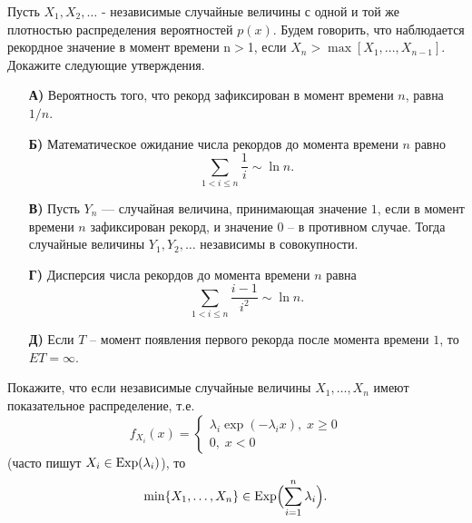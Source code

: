 \begin{problem}[рекорды]
Пусть $X_1 ,X_2 ,\ldots $ - независимые 
случайные величины с одной и той же плотностью распределения вероятностей 
$p(x)$. Будем говорить, что наблюдается рекордное значение в момент времени 
n$>$1, если $X_n >\max \left[ {X_1 ,...,X_{n-1} } \right]$. Докажите 
следующие утверждения.

\begin{enumerate}
\item[\textbf{А)}] Вероятность того, что рекорд зафиксирован в момент времени $n$, 
равна $1/n$.

\item[\textbf{Б)}] Математическое ожидание числа рекордов до момента времени $n$ 
равно 
\[
\sum\limits_{1<i\le n} {\frac{1}{i}} \sim \ln n.
\]

\item[\textbf{В)}] Пусть $Y_n $ --- случайная величина, принимающая значение $1$, если 
в момент времени $n$ зафиксирован рекорд, и значение $0$ -- в противном случае. 
Тогда случайные величины $Y_1 ,Y_2 ,\ldots$ независимы в совокупности.

\item[\textbf{Г)}] Дисперсия числа рекордов до момента времени $n$ равна
\[
\sum\limits_{1<i\le n} {\frac{i-1}{i^2}} \sim \ln n.
\]

\item[\textbf{Д)}] Если $T$ -- момент появления первого рекорда после момента времени $1$, то $ET=\infty $.
\end{enumerate}
\end{problem}


\begin{problem}
Покажите, что если независимые случайные величины $X_1,\ldots, X_n$ имеют показательное распределение, т.е. 
$$
f_{X_i}(x)=\begin{cases}
\lambda_i\exp(-\lambda_i x), \; x\geqslant 0 \\
0,\; x<0
\end{cases}
$$
(часто пишут $X_i\in\mathrm{Exp}(\lambda_i)$), то 
$$
\min\{ X_1,\ldots, X_n\}\in \mathrm{Exp}\Bigl( \sum\limits_{i=1}^{n}\lambda_i\Bigr) . 
$$
\end{problem}


